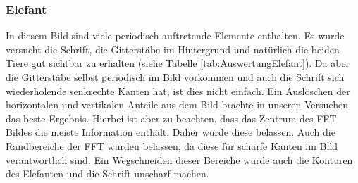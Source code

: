 \documentclass[12pt,german]{article}
\begin{document}
\subsubsection{Elefant}
In diesem Bild sind viele periodisch auftretende Elemente enthalten. Es wurde versucht die Schrift, die Gitterstäbe im Hintergrund und natürlich die beiden Tiere gut sichtbar zu erhalten (siehe Tabelle \ref{tab:AuswertungElefant}). Da aber die Gitterstäbe selbst periodisch im Bild vorkommen und auch die Schrift sich wiederholende senkrechte Kanten hat, ist dies nicht einfach. Ein Auslöschen der horizontalen und vertikalen Anteile aus dem Bild brachte in unseren Versuchen das beste Ergebnis. Hierbei ist aber zu beachten, dass das Zentrum des FFT Bildes die meiste Information enthält. Daher wurde diese belassen. Auch die Randbereiche der FFT wurden belassen, da diese für scharfe Kanten im Bild verantwortlich sind. Ein Wegschneiden dieser Bereiche würde auch die Konturen des Elefanten und die Schrift unscharf machen.
\end{document}
